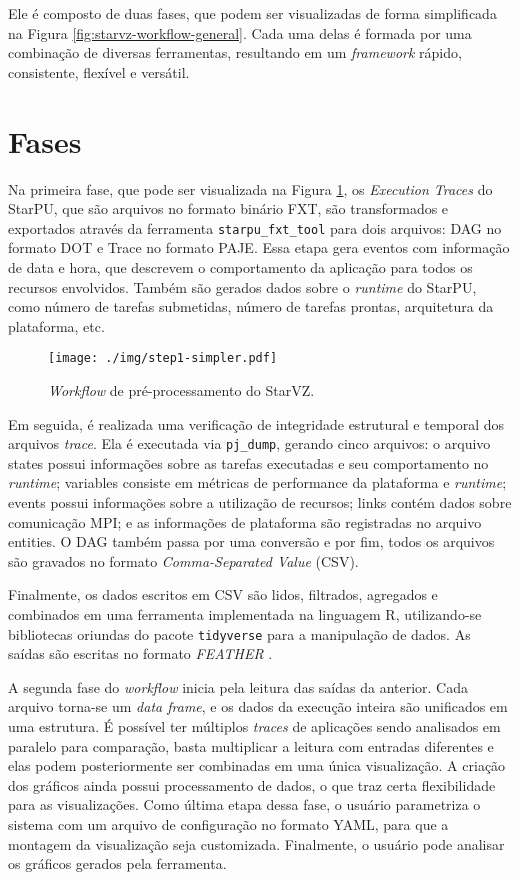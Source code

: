 Ele é composto de duas fases, que podem ser visualizadas de forma simplificada na Figura \ref{fig:starvz-workflow-general}.
Cada uma delas é formada por uma combinação de diversas ferramentas, resultando em um 
\emph{framework} rápido, consistente, flexível e versátil.



\section{Fases}\label{sect:starvz-phases}

Na primeira fase, que pode ser visualizada na Figura \ref{fig:starvz-workflow1}, os 
\emph{Execution Traces} do StarPU, que são arquivos no formato binário FXT, são 
transformados e exportados através da ferramenta \texttt{starpu\_fxt\_tool} para dois 
arquivos: DAG no formato DOT e Trace no formato PAJE. Essa etapa gera eventos com informação de data e hora, 
que descrevem o comportamento da aplicação para todos os recursos envolvidos. 
Também são gerados dados sobre o \emph{runtime} do StarPU, como número de tarefas submetidas,
número de tarefas prontas, arquitetura da plataforma, etc.

\begin{figure}[ht]
 \centerline{\texttt{[image: ./img/step1-simpler.pdf]}}
 \caption{\emph{Workflow} de pré-processamento do StarVZ.}
 \label{fig:starvz-workflow1}
\end{figure}

Em seguida, é realizada uma verificação de integridade estrutural e temporal dos
arquivos \emph{trace}. Ela é executada via \texttt{pj\_dump}, gerando cinco 
arquivos: o arquivo states possui informações sobre as tarefas executadas e seu comportamento no 
\emph{runtime}; variables consiste em métricas de performance da plataforma e \emph{runtime}; events 
possui informações sobre a utilização de recursos; links contém dados sobre comunicação MPI; e as 
informações de plataforma são registradas no arquivo entities. O DAG também passa por uma conversão e por 
fim, todos os arquivos são gravados no formato \emph{Comma-Separated Value} (CSV).

Finalmente, os dados escritos em CSV são lidos, filtrados, agregados e 
combinados em uma ferramenta implementada na linguagem R, utilizando-se bibliotecas oriundas 
do pacote \texttt{tidyverse} para a manipulação de dados. As saídas são escritas no 
formato \emph{FEATHER} \cite{ref:feather}.

A segunda fase do \emph{workflow} inicia pela leitura das saídas da anterior. 
Cada arquivo torna-se um \emph{data frame}, e os dados da execução inteira são unificados em 
uma estrutura. É possível ter múltiplos \emph{traces} de aplicações sendo analisados em 
paralelo para comparação, basta multiplicar a leitura com entradas diferentes e 
elas podem posteriormente ser combinadas em uma única visualização. A criação 
dos gráficos ainda possui processamento de dados, o que traz certa flexibilidade para as 
visualizações. Como última etapa dessa fase, o usuário parametriza o sistema com um arquivo de configuração no formato YAML, para que 
a montagem da visualização seja customizada. Finalmente, o usuário pode analisar 
os gráficos gerados pela ferramenta.

